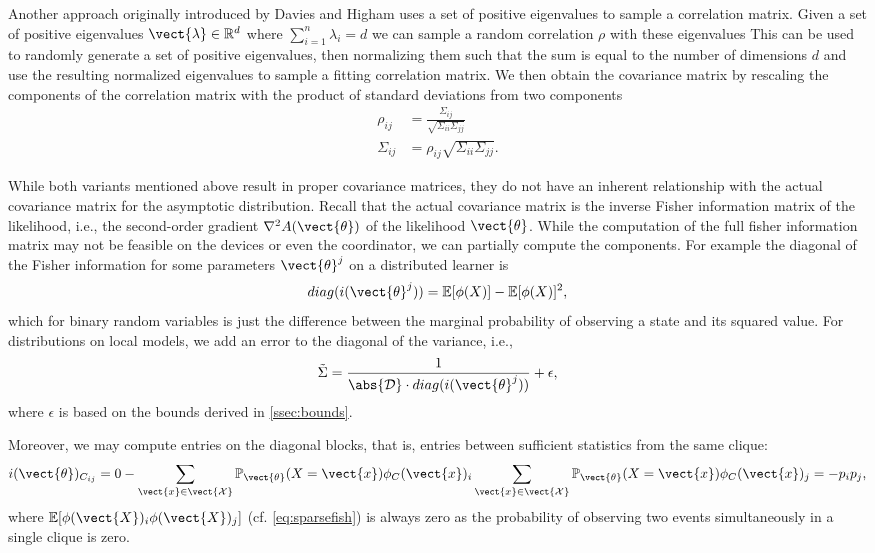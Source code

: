 Another approach originally introduced by Davies and Higham \cite{davies2000numerically} uses a set of positive eigenvalues to sample a correlation matrix.
Given a set of positive eigenvalues $\vect{\lambda}\in \mathbb{R}^d$ where $\sum_{i=1}^n \lambda_i = d$ we can sample a random correlation $\rho$ with these eigenvalues
This can be used to randomly generate a set of positive eigenvalues, then normalizing them such that the sum is equal to the number of dimensions $d$ and use the resulting normalized eigenvalues to sample a fitting correlation matrix. 
We then obtain the covariance matrix by rescaling the components of the correlation matrix with the product of standard deviations from two components 
\begin{equation}
    \begin{split}
            \rho_{ij} &= \frac{\Sigma_{ij}}{\sqrt{\Sigma_{ii}\Sigma_{jj}}} \\
            \Sigma_{ij} &=  \rho_{ij}\sqrt{\Sigma_{ii}\Sigma_{jj}}.
    \end{split}
\end{equation}

While both variants mentioned above result in proper covariance matrices, they do not have an inherent relationship with the actual covariance matrix for the asymptotic distribution.
Recall that the actual covariance matrix is the inverse Fisher information matrix of the likelihood, i.e., the second-order gradient $\nabla^2 A(\vect{\theta})$ of the likelihood \wrt $\vect{\theta}$.
While the computation of the full fisher information matrix may not be feasible on the devices or even the coordinator, we can partially compute the components. 
For example the diagonal of the Fisher information for some parameters $\vect{\theta}^j$ on a distributed learner is 
\begin{equation}
    diag(i(\vect{\theta}^j)) = \mathbb{E}[\phi(X)] - \mathbb{E}[\phi(X)]^2,
\end{equation}
which for binary random variables is just the difference between the marginal probability of observing a state and its squared value.
For distributions on local models, we add an error to the diagonal of the variance, i.e.,
\begin{equation}
    \tilde{\Sigma}=  \frac{1}{\abs{\mathcal{D}} \cdot diag(i(\vect{\theta}^j))} + \epsilon,
\end{equation}
where $\epsilon$ is based on the bounds derived in \autoref{ssec:bounds}.

Moreover, we may compute entries on the diagonal blocks, that is, entries between sufficient statistics from the same clique:
\begin{equation}
    i(\vect{\theta})_{C_{ij}} = 0- \sum_{\vect{x} \in \vect{\mathcal{X}}} \mathbb{P}_{\vect{\theta}}(X= \vect{x}) \phi_C(\vect{x})_i \sum_{\vect{x} \in \vect{\mathcal{X}}} \mathbb{P}_{\vect{\theta}}(X= \vect{x}) \phi_C(\vect{x})_j= - p_i p_j,
\end{equation}
where $ \mathbb{E}[\phi(\vect{X})_i \phi(\vect{X})_j]$ (cf. \autoref{eq:sparsefish}) is always zero as the probability of observing two events simultaneously in a single clique is zero.

